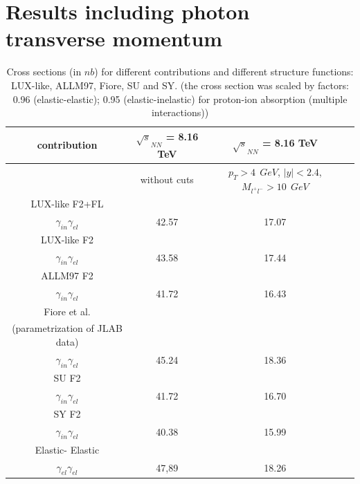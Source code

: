 \section{Results including photon transverse momentum}

\begin{table}[tbp]
\begin{scriptsize}


\centering
\begin{tabular}{|c|c|c|c|}
\hline
contribution               &  $\sqrt{s}_{NN}$ = 8.16 TeV & $\sqrt{s}_{NN}$ = 8.16 TeV \\
\hline
  &  without cuts & $p_{T}>4 ~~GeV$, $|y|<2.4 $, $M_{l^+l^-}>10 ~~GeV$ \\

\hline
        LUX-like  F2+FL                 &      \\

$\gamma_{in} \gamma_{el}$  & 42.57    & 17.07\\

\hline
        LUX-like  F2                &       \\

$\gamma_{in} \gamma_{el}$  & 43.58   &  17.44\\


\hline
      ALLM97 F2          &   \\

      
$\gamma_{in} \gamma_{el}$  & 41.72    &16.43\\

\hline
      Fiore et al.\\(parametrization of JLAB data)    & \\

$\gamma_{in} \gamma_{el}$  & 45.24  &18.36\\
\hline
      SU F2      &        \\

      
$\gamma_{in} \gamma_{el}$  & 41.72   &16.70\\
\hline
      SY F2      &         \\

      
$\gamma_{in} \gamma_{el}$  & 40.38    &15.99\\

\hline
    Elastic- Elastic&               \\
$\gamma_{el} \gamma_{el}$   & 47,89  & 18.26  \\



\hline

\end{tabular}
\caption{Cross sections (in $n b$) for different contributions 
and different structure functions: LUX-like, ALLM97, Fiore, SU and SY.
(the cross section was scaled by factors: 0.96 (elastic-elastic); 0.95 (elastic-inelastic) for proton-ion absorption (multiple interactions))
}
\end{scriptsize}
\end{table}





